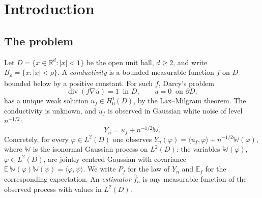 \documentclass[11pt]{article}
\numberwithin{equation}{section}
\newcommand{\R}{\mathbb R}
\newcommand{\E}{\mathbb E}
\newcommand{\diver}{\operatorname{div}}
\begin{document}
\begin{abstract}
Let $u_f$ solve $\diver(f\nabla u)=1$ in the unit ball $D\subset\R^d$,
$d\ge2$, with zero Dirichlet data, and suppose $u_f$ is observed in
Gaussian white noise of level $n^{-1/2}$. We determine the minimax rate
for recovering the conductivity $f$ in squared $L^2(D)$ loss over a
small H\"older--Zygmund ball $\{\|f-1\|_{C^\alpha(D)}\le r\}$,
$\alpha>1$: it is $n^{-2\alpha/(2\alpha+d+3)}$, with no logarithmic
loss. The upper bound inverts the transport equation
$\nabla u\cdot\nabla f+(\Delta u)f=1$ along the gradient flow of the
smoothed data; a bias cancellation for smoothed products
and a variance gain of one power of the bandwidth from integrating the
differentiated noise along characteristics drive the rate. The lower
bound prescribes exact solutions oscillating in the $d-1$ angular
directions, recovers their conductivities through the same transport
inverse, and applies Fano's inequality.
\end{abstract}

\section{Introduction}

\subsection{The problem}

Let $D=\{x\in\R^d:|x|<1\}$ be the open unit ball, $d\ge2$, and write
$B_\rho=\{x:|x|<\rho\}$. A \emph{conductivity} is a bounded measurable
function $f$ on $D$ bounded below by a positive constant. For such
$f$, Darcy's problem
\begin{equation}\label{eq:pde}
 \diver(f\nabla u)=1\ \text{ in }D,\qquad u=0\ \text{ on }\partial D,
\end{equation}
has a unique weak solution $u_f\in H^1_0(D)$, by the Lax--Milgram
theorem. The conductivity is unknown, and $u_f$ is observed in Gaussian
white noise of level $n^{-1/2}$:
\begin{equation}\label{eq:model}
 Y_n=u_f+n^{-1/2}\mathbb W .
\end{equation}
Concretely, for every $\varphi\in L^2(D)$ one observes
$Y_n(\varphi)=\langle u_f,\varphi\rangle+n^{-1/2}\mathbb W(\varphi)$,
where $\mathbb W$ is the isonormal Gaussian process on $L^2(D)$: the
variables $\mathbb W(\varphi)$, $\varphi\in L^2(D)$, are jointly
centred Gaussian with covariance
$\E\,\mathbb W(\varphi)\mathbb W(\psi)=\langle\varphi,\psi\rangle$.
We write $P_f$ for the law of $Y_n$ and $\E_f$ for the corresponding
expectation. An \emph{estimator} $\widehat f_n$ is any measurable
function of the observed process with values in $L^2(D)$.
\end{document}
